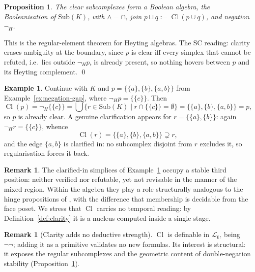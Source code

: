 \documentclass[final,12pt]{elsarticle}
\theoremstyle{plain}
\newtheorem{prop}[thm]{Proposition}
\theoremstyle{definition}
\newtheorem{exa}[thm]{Example}
\newtheorem{rem}[thm]{Remark}
\begin{document}
\begin{prop}
\label{prop:clarity-boolean}
The clear subcomplexes form a Boolean algebra, the Booleanisation of
\(\mathrm{Sub}(K)\), with \(\wedge=\cap\), join
\(p\sqcup q:=\mathop{\mathrm{Cl}}(p\cup q)\), and negation \(\neg_H\).
\end{prop}

\proof
This is the regular-element theorem for Heyting algebras.  The SC reading:
clarity erases ambiguity at the boundary, since \(p\) is clear iff every
simplex that cannot be refuted, i.e.\ lies outside \(\neg_H p\), is already
present, so nothing hovers between \(p\) and its Heyting complement.
\qed

\begin{exa}
\label{ex:clarity}
Continue with \(K\) and \(p=\{\{a\},\{b\},\{a,b\}\}\) from
Example~\ref{ex:negation-gap}, where \(\neg_H p=\{\{c\}\}\).  Then
\[
\mathop{\mathrm{Cl}}(p)=\neg_H\{\{c\}\}
=\bigcup\bigl\{r\in\mathrm{Sub}(K)\;\big|\;r\cap\{\{c\}\}=\emptyset\bigr\}
=\bigl\{\{a\},\{b\},\{a,b\}\bigr\}=p,
\]
so \(p\) is already clear.  A genuine clarification appears for
\(r=\{\{a\},\{b\}\}\): again \(\neg_H r=\{\{c\}\}\), whence
\[
\mathop{\mathrm{Cl}}(r)=\bigl\{\{a\},\{b\},\{a,b\}\bigr\}\supsetneq r,
\]
and the edge \(\{a,b\}\) is clarified in: no subcomplex disjoint from \(r\)
excludes it, so regularisation forces it back.
\end{exa}

\begin{rem}
The clarified-in simplices of Example~\ref{ex:clarity} occupy a stable third
position: neither verified nor refutable, yet not revisable in the manner of
the mixed region.  Within the algebra they play a role structurally analogous
to the hinge propositions of \cite{wittgenstein1969}, with the difference that
membership is decidable from the face poset.  We stress that
\(\mathop{\mathrm{Cl}}\) carries no temporal reading: by
Definition~\ref{def:clarity} it is a nucleus computed inside a single stage.
\end{rem}

\begin{rem}[Clarity adds no deductive strength]
\label{rem:clarity-no-strength}
\(\mathop{\mathrm{Cl}}\) is definable in \(\mathcal{L}_0\), being
\(\neg\neg\); adding it as a primitive validates no new formulas.  Its
interest is structural: it exposes the regular subcomplexes and the geometric
content of double-negation stability (Proposition~\ref{prop:clarity-boolean}).
\end{rem}
\end{document}
